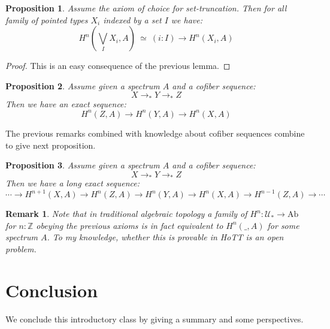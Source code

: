 \documentclass{article}
\newcommand{\se}[1]{\medbreak \medbreak \section{#1}}
\newcommand{\U}{{\mathcal U}}
\renewcommand{\r}{\rightarrow}
\newtheorem{proposition}{Proposition}
\newtheorem{remark}{Remark}
\begin{document}
\begin{proposition}
Assume the axiom of choice for set-truncation. Then for all family of pointed types $X_i$ indexed by a set $I$ we have:
\[H^n(\bigvee_I X_i , A) \ \simeq\ (i:I) \r H^n(X_i,A)\]
\end{proposition}
\begin{proof}
This is an easy consequence of the previous lemma.
\end{proof}

\begin{proposition}
Assume given a spectrum $A$ and a cofiber sequence: 
\[X\r_* Y\r_* Z\]
Then we have an exact sequence:
\[H^n(Z,A) \r H^n(Y,A) \r H^n(X,A) \]
\end{proposition}

The previous remarks combined with knowledge about cofiber sequences combine to give next proposition.

\begin{proposition}
Assume given a spectrum $A$ and a cofiber sequence: 
\[X\r_* Y\r_* Z\]
Then we have a long exact sequence:
\[\cdots \r H^{n+1}(X,A) \r H^n(Z,A) \r H^n(Y,A) \r H^n(X,A) \r H^{n-1}(Z,A) \r \cdots \]
\end{proposition}


\begin{remark}
Note that in traditional algebraic topology a family of $H^n : \U_* \r \mathrm{Ab}$ for $n:\mathbb{Z}$ obeying the previous axioms is in fact equivalent to $H^n(\_,A)$ for some spectrum $A$. To my knowledge, whether this is provable in HoTT is an open problem. %
\end{remark}



\se{Conclusion}

We conclude this introductory class by giving a summary and some perspectives. 
\end{document}
